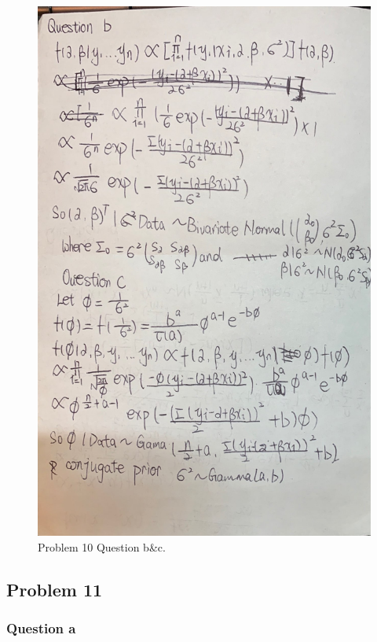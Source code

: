 \documentclass[]{article}
\begin{document}
\begin{figure}
\centering
\includegraphics{./Problem10.jpg}
\caption{Problem 10 Question b\&c.}
\end{figure}

\hypertarget{problem-11}{%
\subsection{Problem 11}\label{problem-11}}

\hypertarget{question-a-6}{%
\subsubsection{Question a}\label{question-a-6}}
\end{document}
